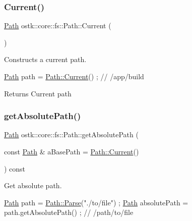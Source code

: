 \subsubsection{\texorpdfstring{Current()}{Current()}}
{\footnotesize\ttfamily \hyperlink{classostk_1_1core_1_1fs_1_1_path}{Path} ostk\+::core\+::fs\+::\+Path\+::\+Current (\begin{DoxyParamCaption}{ }\end{DoxyParamCaption})\hspace{0.3cm}{\ttfamily [static]}}



Constructs a current path. 


\begin{DoxyCode}
\hyperlink{classostk_1_1core_1_1fs_1_1_path_a1a5fff28594542489223b4cfad6cc9fb}{Path} path = \hyperlink{classostk_1_1core_1_1fs_1_1_path_a6a8f1a3d8a52c0dd4fd885ed4dae351a}{Path::Current}() ; \textcolor{comment}{// /app/build}
\end{DoxyCode}


\begin{DoxyReturn}{Returns}
Current path 
\end{DoxyReturn}
\mbox{\label{classostk_1_1core_1_1fs_1_1_path_a03811029482b35c0aca0a23316d55b91}} 
\subsubsection{\texorpdfstring{get\+Absolute\+Path()}{getAbsolutePath()}}
{\footnotesize\ttfamily \hyperlink{classostk_1_1core_1_1fs_1_1_path}{Path} ostk\+::core\+::fs\+::\+Path\+::get\+Absolute\+Path (\begin{DoxyParamCaption}\item[{const \hyperlink{classostk_1_1core_1_1fs_1_1_path}{Path} \&}]{a\+Base\+Path = {\ttfamily \hyperlink{classostk_1_1core_1_1fs_1_1_path_a6a8f1a3d8a52c0dd4fd885ed4dae351a}{Path\+::\+Current}()} }\end{DoxyParamCaption}) const}



Get absolute path. 


\begin{DoxyCode}
\hyperlink{classostk_1_1core_1_1fs_1_1_path_a1a5fff28594542489223b4cfad6cc9fb}{Path} path = \hyperlink{classostk_1_1core_1_1fs_1_1_path_ad08539ba654f5df11c4bcb07276345ad}{Path::Parse}(\textcolor{stringliteral}{"./to/file"}) ;
\hyperlink{classostk_1_1core_1_1fs_1_1_path_a1a5fff28594542489223b4cfad6cc9fb}{Path} absolutePath = path.getAbsolutePath() ; \textcolor{comment}{// /path/to/file}
\end{DoxyCode}



